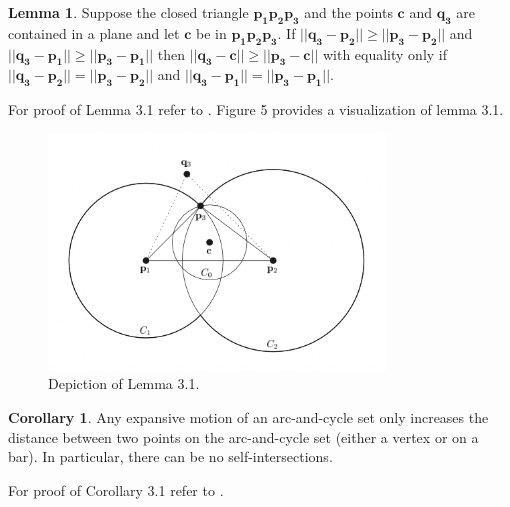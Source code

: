 \documentclass{article}
\theoremstyle{definition}
\newtheorem{lemma}{Lemma}[section]
\newtheorem{corollary}{Corollary}[section]
\begin{document}
\begin{lemma}
    Suppose the closed triangle $\mathbf{p_1p_2p_3}$ and the points $\mathbf{c}$ and $\mathbf{q_3}$ are contained in a plane and let $\mathbf{c}$ be in $\mathbf{p_1p_2p_3}$. If $||\mathbf{q_3} - \mathbf{p_2}|| \geq ||\mathbf{p_3} - \mathbf{p_2}||$ and $||\mathbf{q_3} - \mathbf{p_1}|| \geq ||\mathbf{p_3} - \mathbf{p_1}||$ then $||\mathbf{q_3} - \mathbf{c}|| \geq ||\mathbf{p_3} - \mathbf{c}||$ with equality only if $||\mathbf{q_3} - \mathbf{p_2}|| = ||\mathbf{p_3} - \mathbf{p_2}||$ and $||\mathbf{q_3} - \mathbf{p_1}|| = ||\mathbf{p_3} - \mathbf{p_1}||$.
\end{lemma}
\noindent For proof of Lemma 3.1 refer to \cite{892131}. Figure 5 provides a visualization of lemma 3.1.
\begin{figure}[h]
    \centering
    \includegraphics[width=0.8\textwidth]{Lemma1Image.png}
    \caption{Depiction of Lemma 3.1. \cite{892131}}
\end{figure}
\begin{corollary}
    Any expansive motion of an arc-and-cycle set only increases the distance between two points on the arc-and-cycle set (either a vertex or on a bar). In particular, there can be no self-intersections.
\end{corollary}
\noindent For proof of Corollary 3.1 refer to \cite{892131}.
\end{document}

